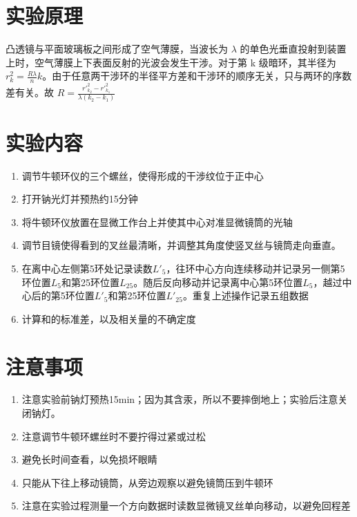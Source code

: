 \documentclass[UTF8]{ctexart}
\title{}
\author{}
\date{}
\begin{document}
\begin{titlepage}		
		
\end{titlepage}


\section{实验原理}
凸透镜与平面玻璃板之间形成了空气薄膜，当波长为 $\lambda$ 的单色光垂直投射到装置上时，空气薄膜上下表面反射的光波会发生干涉。对于第 k 级暗环，其半径为$r^2_k = \frac{R\lambda}{n}k$。由于任意两干涉环的半径平方差和干涉环的顺序无关，只与两环的序数差有关。故 $R = \frac{r'^2_{k_{2}} - r'^2_{k_{1}}}{\lambda(k_2 - k_1)}$


\vspace{3cm} %
\section{实验内容}
\begin{enumerate}
    \item 调节牛顿环仪的三个螺丝，使得形成的干涉纹位于正中心
    \item 打开钠光灯并预热约15分钟
    \item 将牛顿环仪放置在显微工作台上并使其中心对准显微镜筒的光轴
    \item 调节目镜使得看到的叉丝最清晰，并调整其角度使竖叉丝与镜筒走向垂直。
    \item 在离中心左侧第5环处记录读数$L'_5$，往环中心方向连续移动并记录另一侧第5环位置$L_5$和第25环位置$L_{25}$。随后反向移动并记录离中心第5环位置$L_5$，越过中心后的第5环位置$L'_5$和第25环位置$L'_{25}$。重复上述操作记录五组数据
    \item 计算和的标准差，以及相关量的不确定度
\end{enumerate}



\section{注意事项}
\begin{enumerate}
    \item 注意实验前钠灯预热15min；因为其含汞，所以不要摔倒地上；实验后注意关闭钠灯。
    \item 注意调节牛顿环螺丝时不要拧得过紧或过松
    \item 避免长时间查看，以免损坏眼睛
    \item 只能从下往上移动镜筒，从旁边观察以避免镜筒压到牛顿环
    \item 注意在实验过程测量一个方向数据时读数显微镜叉丝单向移动，以避免回程差
\end{enumerate}
\newpage
\end{document}
